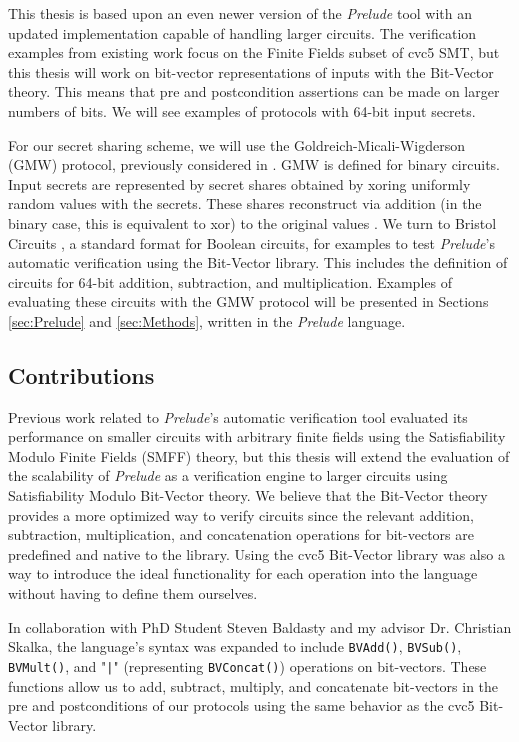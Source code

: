 \documentclass{article}
\begin{document}
This thesis is based upon an even newer version of the \textit{Prelude} tool with an updated implementation capable of handling larger circuits. The verification examples from existing work focus on the Finite Fields subset of cvc5 SMT, but this thesis will work on bit-vector representations of inputs with the Bit-Vector theory. This means that pre and postcondition assertions can be made on larger numbers of bits. We will see examples of protocols with 64-bit input secrets.

For our secret sharing scheme, we will use the Goldreich-Micali-Wigderson (GMW) protocol, previously considered in \cite{skalka-near-ppdp24, skalka-near-esop25}. GMW is defined for binary circuits. Input secrets are represented by secret shares obtained by xoring uniformly random values with the secrets. These shares reconstruct via addition (in the binary case, this is equivalent to xor) to the original values \cite{evans2018pragmatic}. We turn to Bristol Circuits \cite{bristol}, a standard format for Boolean circuits, for examples to test \textit{Prelude}'s automatic verification using the Bit-Vector library. This includes the definition of circuits for 64-bit addition, subtraction, and multiplication. Examples of evaluating these circuits with the GMW protocol will be presented in Sections \ref{sec:Prelude} and \ref{sec:Methods}, written in the \textit{Prelude} language. 
\subsection{Contributions}
\label{sec:Contributions}
Previous work related to \textit{Prelude}'s automatic verification tool \cite{skalka-near-esop25} evaluated its performance on smaller circuits with arbitrary finite fields using the Satisfiability Modulo Finite Fields (SMFF) theory, but this thesis will extend the evaluation of the scalability of \textit{Prelude} as a verification engine to larger circuits using Satisfiability Modulo Bit-Vector theory. We believe that the Bit-Vector theory provides a more optimized way to verify circuits since the relevant addition, subtraction, multiplication, and concatenation operations for bit-vectors are predefined and native to the library. Using the cvc5 Bit-Vector library was also a way to introduce the ideal functionality for each operation into the language without having to define them ourselves. 

In collaboration with PhD Student Steven Baldasty and my advisor Dr. Christian Skalka, the language's syntax was expanded to include \texttt{BVAdd()}, \texttt{BVSub()}, \texttt{BVMult()}, and "\texttt{|}" (representing \texttt{BVConcat()}) operations on bit-vectors. These functions allow us to add, subtract, multiply, and concatenate bit-vectors in the pre and postconditions of our protocols using the same behavior as the cvc5 Bit-Vector library.
\end{document}
